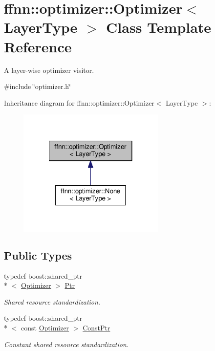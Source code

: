 \hypertarget{classffnn_1_1optimizer_1_1_optimizer}{\section{ffnn\-:\-:optimizer\-:\-:Optimizer$<$ Layer\-Type $>$ Class Template Reference}
\label{classffnn_1_1optimizer_1_1_optimizer}
}


A layer-\/wise optimizer visitor.  




{\ttfamily \#include \char`\"{}optimizer.\-h\char`\"{}}



Inheritance diagram for ffnn\-:\-:optimizer\-:\-:Optimizer$<$ Layer\-Type $>$\-:\nopagebreak
\begin{figure}[H]
\begin{center}
\leavevmode
\includegraphics[width=206pt]{classffnn_1_1optimizer_1_1_optimizer__inherit__graph}
\end{center}
\end{figure}
\subsection*{Public Types}
\begin{DoxyCompactItemize}
\item 
typedef boost\-::shared\-\_\-ptr\\*
$<$ \hyperlink{classffnn_1_1optimizer_1_1_optimizer}{Optimizer} $>$ \hyperlink{classffnn_1_1optimizer_1_1_optimizer_ac03e7181934bf0c12a97fc67a60484ab}{Ptr}
\begin{DoxyCompactList}\small\item\em Shared resource standardization. \end{DoxyCompactList}\item 
typedef boost\-::shared\-\_\-ptr\\*
$<$ const \hyperlink{classffnn_1_1optimizer_1_1_optimizer}{Optimizer} $>$ \hyperlink{classffnn_1_1optimizer_1_1_optimizer_a5d62c55f6f830e993ffe801fb17a1c3a}{Const\-Ptr}
\begin{DoxyCompactList}\small\item\em Constant shared resource standardization. \end{DoxyCompactList}\end{DoxyCompactItemize}
